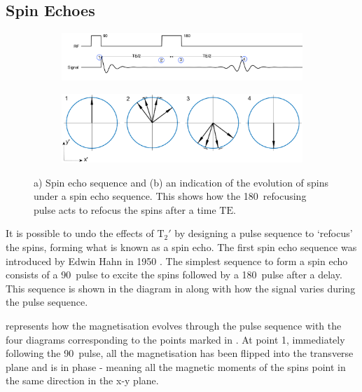 \subsection{Spin Echoes}
\label{sec:spin_echoes}
\begin{figure}
	\centering
	\begin{subfigure}{0.9\textwidth}
		\includegraphics[width = \textwidth]{figures/background/spinecho.png}
		\caption{}
		\label{fig:spinechosequence}
	\end{subfigure}
	
	\begin{subfigure}{0.9\textwidth}
		\includegraphics[width = \textwidth]{figures/background/spinecho_evolution.eps}
		\caption{}
		\label{fig:spinecho_evolution}
	\end{subfigure}

	\caption[The spin echo sequence and the evolution of spin under a spin echo sequence.]{a) Spin echo sequence and (b) an indication of the evolution of spins under a spin echo sequence. This shows how the 180\degree\ refocusing pulse acts to refocus the spins after a time $\mathrm{TE}$.}
	\label{fig:spinecho}
\end{figure}
It is possible to undo the effects of $\mathrm{T}_2'$ by designing a pulse sequence to `refocus' the spins, forming what is known as a spin echo.
The first spin echo sequence was introduced by Edwin Hahn in 1950 \cite{Hahn1950}. The simplest sequence to form a spin echo consists of a 90\degree\ pulse to excite the spins followed by a 180\degree\ pulse after a delay. 
This sequence is shown in the diagram in  along with how the signal varies during the pulse sequence.
 
 represents how the magnetisation evolves through the pulse sequence with the four diagrams corresponding to the points marked in . 
At point 1, immediately following the 90\degree\ pulse, all the magnetisation has been flipped into the transverse plane and is in phase - meaning all the magnetic moments of the spins point in the same direction in the x-y plane. 

